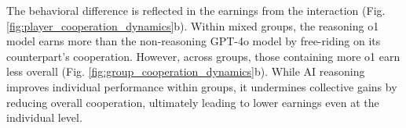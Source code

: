 The behavioral difference is reflected in the earnings from the interaction (Fig. \ref{fig:player_cooperation_dynamics}b).
Within mixed groups, the reasoning o1 model earns more than the non-reasoning GPT-4o model by free-riding on its counterpart’s cooperation.
However, across groups, those containing more o1 earn less overall (Fig. \ref{fig:group_cooperation_dynamics}b).
While AI reasoning improves individual performance within groups, it undermines collective gains by reducing overall cooperation, ultimately leading to lower earnings even at the individual level.
